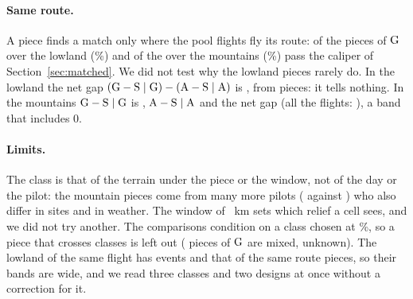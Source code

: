 \paragraph{Same route.} A piece finds a match only where the pool flights fly its route: \TnRouteLowlandPiecesG{} of the \TnRawLowlandPiecesG{} pieces of $\G$ over the lowland (\TnRouteMatchedShareLowland\%) and \TnRouteMountainPiecesG{} of the \TnRawMountainPiecesG{} over the mountains (\TnRouteMatchedShareMountain\%) pass the caliper of Section~\ref{sec:matched}. We did not test why the lowland pieces rarely do. In the lowland the net gap $(\G-\SG)-(\A-\SAA)$ is \TnRouteLowlandD{} \TnRouteLowlandDBand, from \TnRouteLowlandPiecesG{} pieces: it tells nothing. In the mountains $\mathrm{G}-\mathrm{S}\mid\mathrm{G}$ is \TnRouteMountainG{} \TnRouteMountainGBand, $\mathrm{A}-\mathrm{S}\mid\mathrm{A}$ \TnRouteMountainA{} \TnRouteMountainABand{} and the net gap \TnRouteMountainD{} \TnRouteMountainDBand{} (all the flights: \MatDeltaHKD{} \MatDeltaHKDBand), a band that includes 0.

\begin{table}
\centering\small

\caption{$\Delta\Hloc(1000~\mathrm{s})$ by terrain class: pieces of $\G$ (raw, dataset 1000), matched pieces of $\G$ (same route) or events with the four windows (same flight), their flights and pilots, the difference of the design and its 90\% two-way band. Raw: $\G-\Sl$, each population's pieces taken in the class; same route: $(\G-\SG)-(\A-\SAA)$, the pieces of each side in the class; same flight: the drift-free effect $g$. The lowland of the raw design is the plains and the hills together. The pieces of the classes are in Appendix~\ref{app:terrain}.}
\label{tab:terrain}
\end{table}

\paragraph{Limits.} The class is that of the terrain under the piece or the window, not of the day or the pilot: the mountain pieces come from many more pilots (\TnRawMountainPilotsG{} against \TnRawLowlandPilotsG) who also differ in sites and in weather. The window of \TnWindowKm~km sets which relief a cell sees, and we did not try another. The comparisons condition on a class chosen at \TnMajority\%, so a piece that crosses classes is left out (\TnPiecesMixedG{} pieces of $\G$ are mixed, \TnPiecesUnknownG{} unknown). The lowland of the same flight has \TnFlightLowlandEvents{} events and that of the same route \TnRouteLowlandPiecesG{} pieces, so their bands are wide, and we read three classes and two designs at once without a correction for it.

